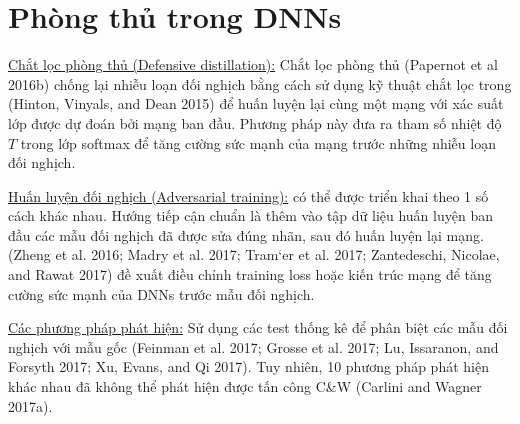 \section{Phòng thủ trong DNNs}
\underline{Chắt lọc phòng thủ (Defensive distillation):} Chắt lọc phòng thủ (Papernot et al 2016b) 
chống lại nhiễu loạn đối nghịch bằng cách sử dụng kỹ thuật chắt lọc trong (Hinton, 
Vinyals, and Dean 2015) để huấn luyện lại cùng một mạng với xác suất lớp được dự đoán bởi 
mạng ban đầu. Phương pháp này đưa ra tham số nhiệt độ $T$ trong lớp softmax để tăng cường 
sức mạnh của mạng trước những nhiễu loạn đối nghịch.

\underline{Huấn luyện đối nghịch (Adversarial training):} có thể được triển khai theo 1 số cách khác nhau. 
Hướng tiếp cận chuẩn là thêm vào tập dữ liệu huấn luyện ban đầu các mẫu đối nghịch đã được 
sửa đúng nhãn, sau đó huấn luyện lại mạng. (Zheng et al. 2016; Madry et al. 2017; 
Tram`er et al. 2017; Zantedeschi, Nicolae, and Rawat 2017) đề xuất điều chỉnh training 
loss hoặc kiến trúc mạng để tăng cường sức mạnh của DNNs trước mẫu đối nghịch.

\underline{Các phương pháp phát hiện:} Sử dụng các test thống kê để phân biệt các mẫu đối nghịch 
với mẫu gốc (Feinman et al. 2017; Grosse et al. 2017; Lu, Issaranon, and Forsyth 2017; 
Xu, Evans, and Qi 2017). Tuy nhiên, 10 phương pháp phát hiện khác nhau đã không thể phát 
hiện được tấn công C\&W (Carlini and Wagner 2017a).